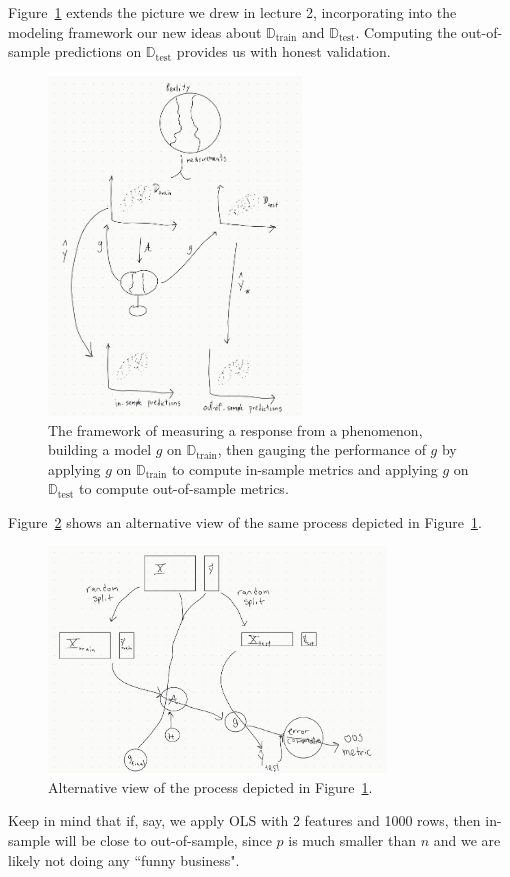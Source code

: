 \documentclass[12pt, a4paper]{article}
\theoremstyle{definition}
\begin{document}
	Figure~\ref{fig:measure-build-test-predict} extends the picture we
	drew in lecture 2, incorporating into the modeling framework our new
	ideas about $\mathbb{D}_{\text{train}}$ and $\mathbb{D}_{\text{test}}$.
	Computing the out-of-sample predictions on $\mathbb{D}_{\text{test}}$
	provides us with honest validation.
	\begin{figure}
		\centering
		\includegraphics[width=0.6\textwidth]{measure-build-test-predict-process}
		\caption{The framework of measuring a response from a phenomenon,
		building a model $g$ on $\mathbb{D}_{\text{train}}$, then gauging the
		performance of $g$ by applying $g$ on $\mathbb{D}_{\text{train}}$
		to compute in-sample metrics and applying $g$ on $\mathbb{D}_{\text{test}}$
		to compute out-of-sample metrics.}
		\label{fig:measure-build-test-predict}
	\end{figure}
	
	Figure~\ref{fig:measure-build-test-predict-v2} shows an alternative view of
	the same process depicted in Figure~\ref{fig:measure-build-test-predict}.
	\begin{figure}
		\centering
		\includegraphics[width=0.8\textwidth]{measure-build-test-predict-process-v2}
		\caption{Alternative view of the process depicted in Figure~\ref{fig:measure-build-test-predict}.}
		\label{fig:measure-build-test-predict-v2}
	\end{figure}
	Keep in mind that if, say, we apply OLS with 2 features and 1000 rows,
	then in-sample will be close to out-of-sample, since $p$ is much smaller
	than $n$ and we are likely not doing any ``funny business".
	
\end{document}
